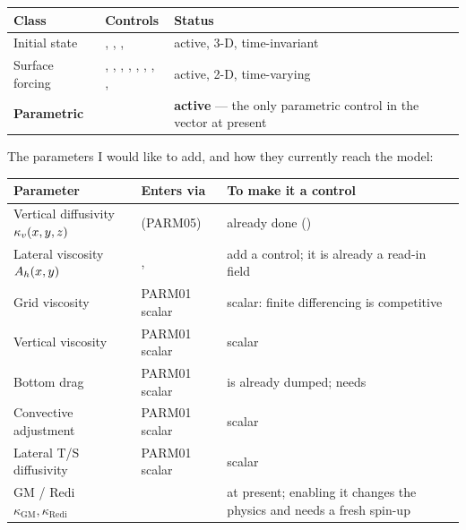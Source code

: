 \begin{center}
\begin{tabularx}{\textwidth}{@{}Y{0.55}Y{1.25}Y{1.2}@{}}
\toprule
\textbf{Class} & \textbf{Controls} & \textbf{Status}\\
\midrule
Initial state & , , ,
   & active, 3-D, time-invariant\\
Surface forcing & , , ,
  , , , ,
  ,  & active, 2-D, time-varying\\
\textbf{Parametric} &  & \textbf{active} --- the only
  parametric control in the vector at present\\
\bottomrule
\end{tabularx}
\end{center}

The parameters I would like to add, and how they currently reach the model:

\begin{center}
\begin{tabularx}{\textwidth}{@{}Y{0.7}Y{0.75}Y{1.55}@{}}
\toprule
\textbf{Parameter} & \textbf{Enters via} & \textbf{To make it a control}\\
\midrule
Vertical diffusivity $\kappa_{v}(x,y,z)$ &  (PARM05)
  & already done ()\\
Lateral viscosity $A_{h}(x,y)$ & , 
  & add a  control; it is already a read-in field\\
Grid viscosity  & PARM01 scalar & scalar: finite differencing is
  competitive\\
Vertical viscosity  & PARM01 scalar & scalar\\
Bottom drag  & PARM01 scalar
  &  is already dumped; needs \\
Convective adjustment  & PARM01 scalar & scalar\\
Lateral T/S diffusivity  & PARM01 scalar & scalar\\
GM / Redi $\kappa_{\mathrm{GM}},\kappa_{\mathrm{Redi}}$
  &  &  at present; enabling it
    changes the physics and needs a fresh spin-up\\
\bottomrule
\end{tabularx}
\end{center}

